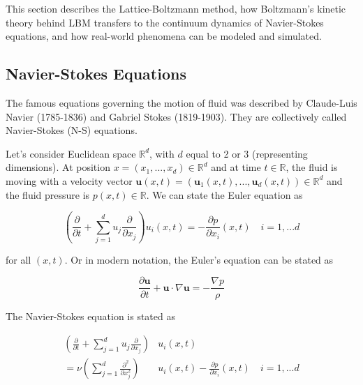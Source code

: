 This section describes the Lattice-Boltzmann method, how Boltzmann's kinetic theory behind LBM transfers to the continuum dynamics of Navier-Stokes equations, and how real-world phenomena can be modeled and simulated.




\subsection{Navier-Stokes Equations}
The famous equations governing the motion of fluid was described by Claude-Luis Navier (1785-1836) and Gabriel Stokes (1819-1903). They are collectively called Navier-Stokes (N-S) equations.

Let's consider Euclidean space $\mathbb{R}^d$, with $d$ equal to 2 or 3 (representing dimensions). At position $x = (x_1,...,x_d) \in \mathbb{R}^d$ and at time $t \in \mathbb{R}$, the fluid is moving with a velocity vector $\bm{u}(x,t) = (\bm{u}_1(x,t),...,\bm{u}_d(x,t)) \in \mathbb{R}^d$ and the fluid pressure is $p(x,t) \in \mathbb{R}$. We can state the Euler equation as


\begin{equation} 
	\label{eqn:ee}
	\left(\frac{\partial}{\partial t} + \sum_{j=1}^{d} u_j \frac{\partial}{\partial x_j}\right) u_i(x,t) = - \frac{\partial p}{\partial x_i} (x,t) \quad  i = 1,...d
\end{equation}

for all $(x, t)$. Or in modern notation, the Euler's equation can be stated as

\begin{equation} 
	\label{eqn:ee-modern}
	\frac{\partial \bm{u}}{\partial t} + \bm{u} \cdot \nabla \bm{u} = - \frac{\nabla p}{\rho}
\end{equation}

The Navier-Stokes equation is stated as

\begin{align} 
	\label{eqn:ns}
	\left(\frac{\partial}{\partial t} + \sum_{j=1}^{d} u_j \frac{\partial}{\partial x_j}\right) &u_i(x,t) \\
	 = \nu \left(\sum_{j=1}^{d} \frac{\partial^2}{\partial x_j^2}\right) &u_i(x,t) - \frac{\partial p}{\partial x_i} (x,t) \quad  i = 1,...d
\end{align}

